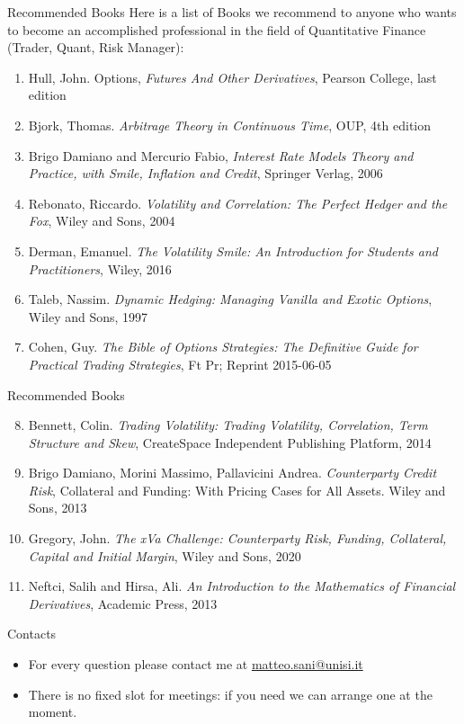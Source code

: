 \documentclass{beamer}
\begin{document}
\begin{frame}{Recommended Books}
	Here is a list of Books we recommend to anyone who wants to become an accomplished professional in the field of Quantitative Finance (Trader, Quant, Risk Manager):
	\begin{enumerate}
	\item Hull, John. Options, \textit{Futures And Other Derivatives}, Pearson College, last edition
	\item Bjork, Thomas. \textit{Arbitrage Theory in Continuous Time}, OUP, 4th edition
	\item Brigo Damiano and Mercurio Fabio, \textit{Interest Rate Models Theory and Practice, with Smile, Inflation and Credit}, Springer Verlag, 2006
	\item Rebonato, Riccardo. \textit{Volatility and Correlation: The Perfect Hedger and the Fox}, Wiley and Sons, 2004
	\item Derman, Emanuel. \textit{The Volatility Smile: An Introduction for Students and Practitioners}, Wiley, 2016
	\item Taleb, Nassim. \textit{Dynamic Hedging: Managing Vanilla and Exotic Options}, Wiley and Sons, 1997
	\item Cohen, Guy. \textit{The Bible of Options Strategies: The Definitive Guide for Practical Trading Strategies}, Ft Pr; Reprint 2015-06-05
\end{enumerate}
\end{frame}

\begin{frame}{Recommended Books}
	\begin{enumerate}
		\setcounter{enumi}{7}
		\item Bennett, Colin. \textit{Trading Volatility: Trading Volatility, Correlation, Term Structure and Skew}, CreateSpace Independent Publishing Platform, 2014
		\item Brigo Damiano, Morini Massimo, Pallavicini Andrea. \textit{Counterparty Credit Risk}, Collateral and Funding: With Pricing Cases for All Assets. Wiley and Sons, 2013
		\item Gregory, John. \textit{The xVa Challenge: Counterparty Risk, Funding, Collateral, Capital and Initial Margin}, Wiley and Sons, 2020
		\item Neftci, Salih and Hirsa, Ali. \textit{An Introduction to the Mathematics of Financial Derivatives}, Academic Press, 2013
	\end{enumerate}
\end{frame}

\begin{frame}{Contacts}
	\begin{itemize}
		\item For every question please contact me at \href{mailto:matteo.sani@unisi.it}{matteo.sani@unisi.it}
		\item There is no fixed slot for meetings: if you need we can arrange one at the moment. 		
	\end{itemize}
\end{frame}
\end{document}
